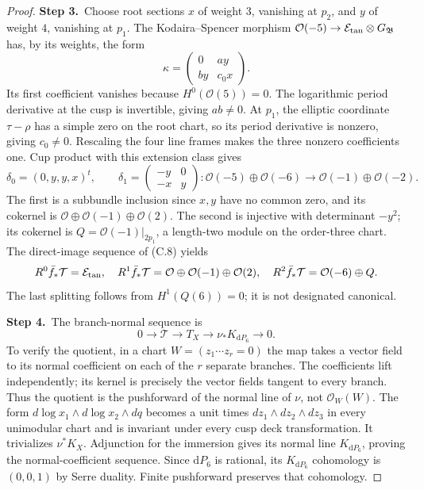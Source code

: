 \begin{proof}
\par\smallskip\noindent\textbf{Step 3.}\ Choose root sections $x$ of weight $3$, vanishing at $p_2$, and $y$ of weight $4$, vanishing at $p_1$. The Kodaira--Spencer morphism $\mathcal O(-5)\to \mathcal E_{\rm tan}\otimes G_{\mathfrak B}$ has, by its weights, the form
\[
 \kappa=\begin{pmatrix}0&a y\\b y&c_0x\end{pmatrix}.
\]
Its first coefficient vanishes because $H^0(\mathcal O(5))=0$. The logarithmic period derivative at the cusp is invertible, giving $ab\ne0$. At $p_1$, the elliptic coordinate $\tau-\rho$ has a simple zero on the root chart, so its period derivative is nonzero, giving $c_0\ne0$. Rescaling the four line frames makes the three nonzero coefficients one. Cup product with this extension class gives
\[
\delta_0=(0,y,y,x)^t,\qquad
\delta_1=\begin{pmatrix}-y&0\\-x&y\end{pmatrix}:
 \mathcal O(-5)\oplus\mathcal O(-6)\to\mathcal O(-1)\oplus\mathcal O(-2).
\]
The first is a subbundle inclusion since $x,y$ have no common zero, and its cokernel is $\mathcal O\oplus\mathcal O(-1)\oplus\mathcal O(2)$. The second is injective with determinant $-y^2$; its cokernel is
$Q=\mathcal O(-1)|_{2p_1}$, a length-two module on the order-three chart. The direct-image sequence of (C.8) yields
\[
 R^0\bar f_*\mathcal T=\mathcal E_{\rm tan},\quad
 R^1\bar f_*\mathcal T=\mathcal O\oplus\mathcal O(-1)\oplus\mathcal O(2),\quad
 R^2\bar f_*\mathcal T=\mathcal O(-6)\oplus Q.
\]
The last splitting follows from $H^1(Q(6))=0$; it is not designated canonical.

\par\smallskip\noindent\textbf{Step 4.}\ The branch-normal sequence is
\[
0\longrightarrow\mathcal T\longrightarrow T_X
\longrightarrow\nu_*K_{\mathrm dP_6}\longrightarrow0.
\]
To verify the quotient, in a chart $W=(z_1\cdots z_r=0)$ the map takes
a vector field to its normal coefficient on each of the $r$ separate
branches. The coefficients lift independently; its kernel is precisely
the vector fields tangent to every branch. Thus the quotient is the
pushforward of the normal line of $\nu$, not $\mathcal O_W(W)$.
The form $d\log x_1\wedge d\log x_2\wedge dq$ becomes a unit times
$dz_1\wedge dz_2\wedge dz_3$ in every unimodular chart and is invariant
under every cusp deck transformation. It trivializes $\nu^*K_X$.
Adjunction for the immersion gives its normal line $K_{\mathrm dP_6}$, proving
the normal-coefficient sequence. Since $\mathrm dP_6$ is rational, its $K_{\mathrm dP_6}$ cohomology is $(0,0,1)$ by
Serre duality. Finite pushforward preserves that cohomology.


\end{proof}
